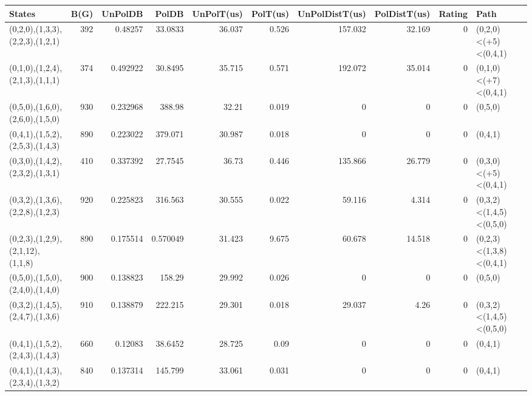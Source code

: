 \begin{tabular}{lrrrrrrrrl}
\hline
 States                             &   B(G) &   UnPolDB &      PolDB &   UnPolT(us) &   PolT(us) &   UnPolDistT(us) &   PolDistT(us) &   Rating & Path                    \\
\hline
 (0,2,0),(1,3,3),(2,2,3),(1,2,1)    &    392 & 0.48257   &  33.0833   &       36.037 &      0.526 &          157.032 &         32.169 &        0 & (0,2,0)<(+5)<(0,4,1)    \\
 (0,1,0),(1,2,4),(2,1,3),(1,1,1)    &    374 & 0.492922  &  30.8495   &       35.715 &      0.571 &          192.072 &         35.014 &        0 & (0,1,0)<(+7)<(0,4,1)    \\
 (0,5,0),(1,6,0),(2,6,0),(1,5,0)    &    930 & 0.232968  & 388.98     &       32.21  &      0.019 &            0     &          0     &        0 & (0,5,0)                 \\
 (0,4,1),(1,5,2),(2,5,3),(1,4,3)    &    890 & 0.223022  & 379.071    &       30.987 &      0.018 &            0     &          0     &        0 & (0,4,1)                 \\
 (0,3,0),(1,4,2),(2,3,2),(1,3,1)    &    410 & 0.337392  &  27.7545   &       36.73  &      0.446 &          135.866 &         26.779 &        0 & (0,3,0)<(+5)<(0,4,1)    \\
 (0,3,2),(1,3,6),(2,2,8),(1,2,3)    &    920 & 0.225823  & 316.563    &       30.555 &      0.022 &           59.116 &          4.314 &        0 & (0,3,2)<(1,4,5)<(0,5,0) \\
 (0,2,3),(1,2,9),(2,1,12),(1,1,8)   &    890 & 0.175514  &   0.570049 &       31.423 &      9.675 &           60.678 &         14.518 &        0 & (0,2,3)<(1,3,8)<(0,4,1) \\
 (0,5,0),(1,5,0),(2,4,0),(1,4,0)    &    900 & 0.138823  & 158.29     &       29.992 &      0.026 &            0     &          0     &        0 & (0,5,0)                 \\
 (0,3,2),(1,4,5),(2,4,7),(1,3,6)    &    910 & 0.138879  & 222.215    &       29.301 &      0.018 &           29.037 &          4.26  &        0 & (0,3,2)<(1,4,5)<(0,5,0) \\
 (0,4,1),(1,5,2),(2,4,3),(1,4,3)    &    660 & 0.12083   &  38.6452   &       28.725 &      0.09  &            0     &          0     &        0 & (0,4,1)                 \\
 (0,4,1),(1,4,3),(2,3,4),(1,3,2)    &    840 & 0.137314  & 145.799    &       33.061 &      0.031 &            0     &          0     &        0 & (0,4,1)                 \\

\end{tabular}
